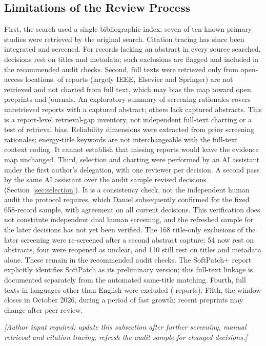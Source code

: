 \documentclass[journal]{IEEEtran}
\newcommand{\authorinput}[1]{\par\noindent\textit{[Author input required: #1]}\par\smallskip}
\begin{document}
\subsection{Limitations of the Review Process}
\label{sec:limits-process}
First, the search used a single bibliographic index; seven of ten known primary studies were retrieved by the original search. Citation tracing has since been integrated and screened. For records lacking an abstract in every source searched, decisions rest on titles and metadata; such exclusions are flagged and included in the recommended audit checks. Second, full texts were retrieved only from open-access locations. \nNotRetrieved{} of \nSought{} reports (largely IEEE, Elsevier and Springer) are not retrieved and not charted from full text, which may bias the map toward open preprints and journals. An exploratory summary of screening rationales covers \nTier{} unretrieved reports with a captured abstract; \nTierTitleOnly{} others lack captured abstracts. This is a report-level retrieval-gap inventory, not independent full-text charting or a test of retrieval bias. Reliability dimensions were extracted from prior screening rationales; energy-title keywords are not interchangeable with the full-text context coding. It cannot establish that missing reports would leave the evidence map unchanged. Third, selection and charting were performed by an AI assistant under the first author's delegation, with one reviewer per decision. A second pass by the same AI assistant over the audit sample revised \nAuditRevised{} decisions (Section~\ref{sec:selection}). It is a consistency check, not the independent human audit the protocol requires, which Daniel subsequently confirmed for the fixed 658-record sample, with agreement on all current decisions. This verification does not constitute independent dual human screening, and the refreshed sample for the later decisions has not yet been verified. The 168 title-only exclusions of the later screening were re-screened after a second abstract capture: 54 now rest on abstracts, four were reopened as unclear, and 110 still rest on titles and metadata alone. These remain in the recommended audit checks. The SoftPatch+ report explicitly identifies SoftPatch as its preliminary version; this full-text linkage is documented separately from the automated same-title matching. Fourth, full texts in languages other than English were excluded (\nExFTFive{} reports). Fifth, the window closes in October 2026, during a period of fast growth; recent preprints may change after peer review.
\authorinput{update this subsection after further screening, manual retrieval and citation tracing; refresh the audit sample for changed decisions.}
\end{document}
